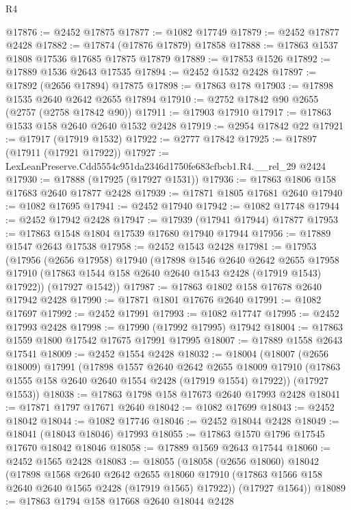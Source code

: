 \begin{lexlean}{R4}
\begin{coremodule}
@17876 := @2452 @17875
@17877 := @1082 @17749
@17879 := @2452 @17877 @2428
@17882 := @17874 (@17876 @17879) @17858
@17888 := @17863 @1537 @1808 @17536 @17685 @17875 @17879
@17889 := @17853 @1526
@17892 := @17889 @1536 @2643 @17535
@17894 := @2452 @1532 @2428
@17897 := @17892 (@2656 @17894) @17875
@17898 := @17863 @178
@17903 := @17898 @1535 @2640 @2642 @2655 @17894
@17910 := @2752 @17842 @90 @2655 (@2757 (@2758 @17842 @90))
@17911 := @17903 @17910
@17917 := @17863 @1533 @158 @2640 @2640 @1532 @2428
@17919 := @2954 @17842 @22
@17921 := @17917 (@17919 @1532)
@17922 := @2777 @17842
@17925 := @17897 (@17911 (@17921 @17922))
@17927 := LexLeanPreserve.Cdd5554c951da2346d1750fe683cfbcb1.R4.__rel_29 @2424
@17930 := @17888 (@17925 (@17927 @1531))
@17936 := @17863 @1806 @158 @17683 @2640 @17877 @2428
@17939 := @17871 @1805 @17681 @2640
@17940 := @1082 @17695
@17941 := @2452 @17940
@17942 := @1082 @17748
@17944 := @2452 @17942 @2428
@17947 := @17939 (@17941 @17944) @17877
@17953 := @17863 @1548 @1804 @17539 @17680 @17940 @17944
@17956 := @17889 @1547 @2643 @17538
@17958 := @2452 @1543 @2428
@17981 := @17953
    (@17956
      (@2656 @17958)
      @17940
      (@17898
        @1546
        @2640
        @2642
        @2655
        @17958
        @17910
        (@17863 @1544 @158 @2640 @2640 @1543 @2428 (@17919 @1543) @17922))
      (@17927 @1542))
@17987 := @17863 @1802 @158 @17678 @2640 @17942 @2428
@17990 := @17871 @1801 @17676 @2640
@17991 := @1082 @17697
@17992 := @2452 @17991
@17993 := @1082 @17747
@17995 := @2452 @17993 @2428
@17998 := @17990 (@17992 @17995) @17942
@18004 := @17863 @1559 @1800 @17542 @17675 @17991 @17995
@18007 := @17889 @1558 @2643 @17541
@18009 := @2452 @1554 @2428
@18032 := @18004
    (@18007
      (@2656 @18009)
      @17991
      (@17898
        @1557
        @2640
        @2642
        @2655
        @18009
        @17910
        (@17863 @1555 @158 @2640 @2640 @1554 @2428 (@17919 @1554) @17922))
      (@17927 @1553))
@18038 := @17863 @1798 @158 @17673 @2640 @17993 @2428
@18041 := @17871 @1797 @17671 @2640
@18042 := @1082 @17699
@18043 := @2452 @18042
@18044 := @1082 @17746
@18046 := @2452 @18044 @2428
@18049 := @18041 (@18043 @18046) @17993
@18055 := @17863 @1570 @1796 @17545 @17670 @18042 @18046
@18058 := @17889 @1569 @2643 @17544
@18060 := @2452 @1565 @2428
@18083 := @18055
    (@18058
      (@2656 @18060)
      @18042
      (@17898
        @1568
        @2640
        @2642
        @2655
        @18060
        @17910
        (@17863 @1566 @158 @2640 @2640 @1565 @2428 (@17919 @1565) @17922))
      (@17927 @1564))
@18089 := @17863 @1794 @158 @17668 @2640 @18044 @2428

\end{coremodule}
\end{lexlean}
